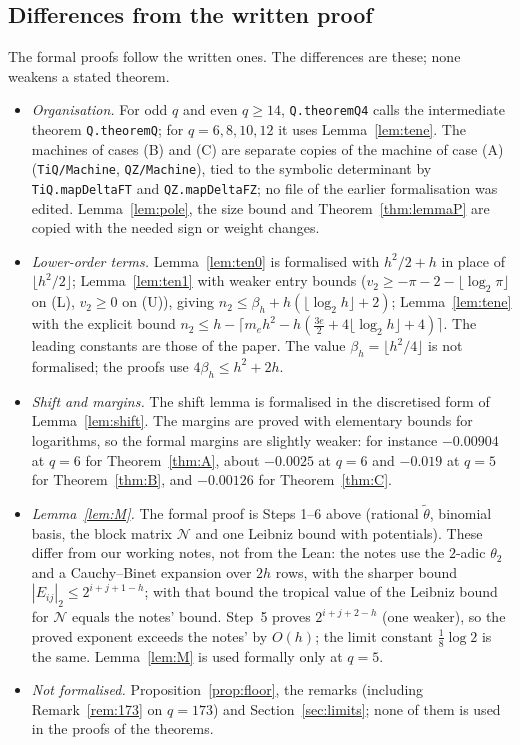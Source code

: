 \documentclass[11pt]{amsart}
\theoremstyle{definition}
\theoremstyle{remark}
\numberwithin{equation}{section}
\newcommand{\lean}[1]{{\def\_{\textunderscore\allowbreak}\texttt{#1}}}
\begin{document}
\subsection{Differences from the written proof}\label{sec:lean-departures}
The formal proofs follow the written ones. The differences are these; none weakens a stated theorem.
\begin{itemize}
\item \emph{Organisation.} For odd $q$ and even $q\ge14$, \lean{Q.theoremQ4} calls the intermediate theorem
  \lean{Q.theoremQ}; for $q=6,8,10,12$ it uses Lemma~\ref{lem:tene}. The machines of cases (B) and (C) are separate copies
  of the machine of case (A) (\lean{TiQ\slash{}Machine}, \lean{QZ\slash{}Machine}), tied to the symbolic determinant by
  \lean{TiQ.map\_DeltaFT} and \lean{QZ.map\_DeltaF\_Z}; no file of the earlier formalisation was edited. Lemma~\ref{lem:pole},
  the size bound and Theorem~\ref{thm:lemmaP} are copied with the needed sign or weight changes.
\item \emph{Lower-order terms.} Lemma~\ref{lem:ten0} is formalised with $h^2/2+h$ in place of $\lfloor h^2/2\rfloor$;
  Lemma~\ref{lem:ten1} with weaker entry bounds ($v_2\ge-\pi-2-\lfloor\log_2\pi\rfloor$ on (L), $v_2\ge0$ on (U)), giving
  $n_2\le\beta_h+h(\lfloor\log_2h\rfloor+2)$; Lemma~\ref{lem:tene} with the explicit bound
  $n_2\le h-\lceil m_eh^2-h(\frac{3e}2+4\lfloor\log_2h\rfloor+4)\rceil$. The leading constants are those of the paper. The value
  $\beta_h=\lfloor h^2/4\rfloor$ is not formalised; the proofs use $4\beta_h\le h^2+2h$.
\item \emph{Shift and margins.} The shift lemma is formalised in the discretised form of Lemma~\ref{lem:shift}. The margins
  are proved with elementary bounds for logarithms, so the formal margins are slightly weaker: for instance $-0.00904$ at
  $q=6$ for Theorem~\ref{thm:A}, about $-0.0025$ at $q=6$ and $-0.019$ at $q=5$ for Theorem~\ref{thm:B}, and $-0.00126$ for Theorem~\ref{thm:C}.
\item \emph{Lemma~\ref{lem:M}.} The formal proof is Steps 1--6 above (rational $\tilde\theta$, binomial basis, the
  block matrix $\mathcal N$ and one Leibniz bound with potentials). These differ from our working notes, not from the
  Lean: the notes use the $2$-adic $\theta_2$ and a Cauchy--Binet expansion over $2h$ rows, with the sharper bound
  $|E_{ij}|_2\le2^{i+j+1-h}$; with that bound the tropical value of the Leibniz bound for $\mathcal N$ equals the notes'
  bound. Step~5 proves $2^{i+j+2-h}$ (one weaker), so the proved exponent exceeds the notes' by $O(h)$; the limit
  constant $\frac18\log2$ is the same. Lemma~\ref{lem:M} is used formally only at $q=5$.
\item \emph{Not formalised.} Proposition~\ref{prop:floor}, the remarks (including Remark~\ref{rem:173} on $q=173$)
  and Section~\ref{sec:limits}; none of them is used in the proofs of the theorems.
\end{itemize}
\end{document}
